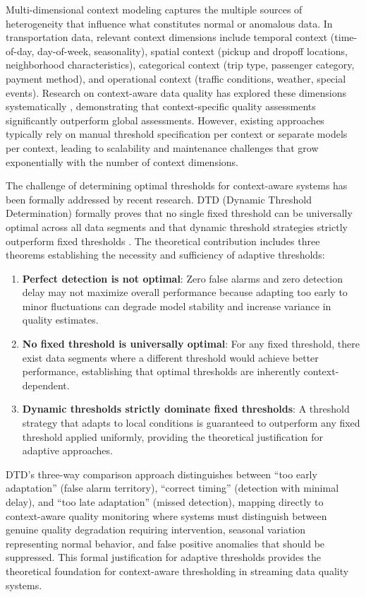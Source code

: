 Multi-dimensional context modeling captures the multiple sources of heterogeneity that influence what constitutes normal or anomalous data. In transportation data, relevant context dimensions include temporal context (time-of-day, day-of-week, seasonality), spatial context (pickup and dropoff locations, neighborhood characteristics), categorical context (trip type, passenger category, payment method), and operational context (traffic conditions, weather, special events). Research on context-aware data quality has explored these dimensions systematically \citep{contextdq2022}, demonstrating that context-specific quality assessments significantly outperform global assessments. However, existing approaches typically rely on manual threshold specification per context or separate models per context, leading to scalability and maintenance challenges that grow exponentially with the number of context dimensions.

The challenge of determining optimal thresholds for context-aware systems has been formally addressed by recent research. DTD (Dynamic Threshold Determination) formally proves that no single fixed threshold can be universally optimal across all data segments and that dynamic threshold strategies strictly outperform fixed thresholds \citep{dtd2026}. The theoretical contribution includes three theorems establishing the necessity and sufficiency of adaptive thresholds:

\begin{enumerate}
\item \textbf{Perfect detection is not optimal}: Zero false alarms and zero detection delay may not maximize overall performance because adapting too early to minor fluctuations can degrade model stability and increase variance in quality estimates.
\item \textbf{No fixed threshold is universally optimal}: For any fixed threshold, there exist data segments where a different threshold would achieve better performance, establishing that optimal thresholds are inherently context-dependent.
\item \textbf{Dynamic thresholds strictly dominate fixed thresholds}: A threshold strategy that adapts to local conditions is guaranteed to outperform any fixed threshold applied uniformly, providing the theoretical justification for adaptive approaches.
\end{enumerate}

DTD's three-way comparison approach distinguishes between ``too early adaptation'' (false alarm territory), ``correct timing'' (detection with minimal delay), and ``too late adaptation'' (missed detection), mapping directly to context-aware quality monitoring where systems must distinguish between genuine quality degradation requiring intervention, seasonal variation representing normal behavior, and false positive anomalies that should be suppressed. This formal justification for adaptive thresholds provides the theoretical foundation for context-aware thresholding in streaming data quality systems.

